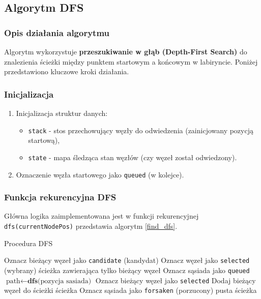 \documentclass[../../../../doc.tex]{subfiles}
\begin{document}
\subsection{Algorytm DFS}


\subsubsection{Opis działania algorytmu}

Algorytm wykorzystuje \textbf{przeszukiwanie w głąb (Depth-First Search)} do znalezienia ścieżki między punktem startowym a końcowym w labiryncie. Poniżej przedstawiono kluczowe kroki działania.

\subsubsection{Inicjalizacja}
\begin{enumerate}
  \item Inicjalizacja struktur danych:
        \begin{itemize}
          \item \texttt{stack} - stos przechowujący węzły do odwiedzenia (zainicjowany pozycją startową),
          \item \texttt{state} - mapa śledząca stan węzłów (czy węzeł został odwiedzony).
        \end{itemize}
  \item Oznaczenie węzła startowego jako \texttt{queued} (w kolejce).
\end{enumerate}

\subsubsection{Funkcja rekurencyjna DFS}
Główna logika zaimplementowana jest w funkcji rekurencyjnej \texttt{dfs(currentNodePos)} przedstawia algorytm \ref{find_dfs}.

\begin{algorithm}
  \caption{Procedura DFS}
  \label{find_dfs}
  \begin{algorithmic}
    \STATE Oznacz bieżący węzeł jako \texttt{candidate} (kandydat)
    \STATE Oznacz węzeł jako \texttt{selected} (wybrany)
    \RETURN ścieżka zawierająca tylko bieżący węzeł
    \ENDIF
    \STATE Oznacz sąsiada jako \texttt{queued}
    \STATE $\text{path} \leftarrow \textbf{dfs}\text{(pozycja sasiada)}$
    \STATE Oznacz bieżący węzeł jako \texttt{selected}
    \STATE Dodaj bieżący węzeł do ścieżki
    \RETURN ścieżka
    \ELSE
    \STATE Oznacz sąsiada jako \texttt{forsaken} (porzucony)
    \ENDIF
    \ENDIF
    \ENDFOR
    \RETURN pusta ścieżka
  \end{algorithmic}
\end{algorithm}
\end{document}
